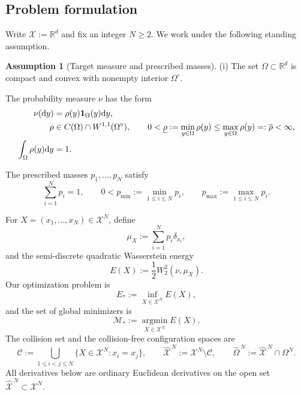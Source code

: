 \documentclass[11pt]{article}
\def\R{\mathbb{R}}
\def\Mc{{\mathcal M}}
\def\Xc{{\mathcal X}}
\def\id{\mathbf{1}}
\def\hOm{\widehat{\Omega}^{\,N}}
\def\hX{\widehat{\Xc}^{\,N}}
\newcommand{\dd}{\mathrm{d}}
\newcommand{\argmin}{\operatorname*{argmin}}
\newcommand{\Coll}{\mathscr C}
\newcommand{\pmin}{p_{\min}}
\newcommand{\pmax}{p_{\max}}
\theoremstyle{definition}
\newtheorem{assumption}{Assumption}
\theoremstyle{remark}
\numberwithin{equation}{section}
\begin{document}
\subsection{Problem formulation}\label{subsec:problem-formulation}

Write $\Xc:=\mathbb R^d$ and fix an integer $N\ge2$.  We work under the following standing assumption.

\begin{assumption}[Target measure and prescribed masses]\label{ass:geometry}
{\rm (i)} The set $\Omega\subset\R^d$ is compact and convex with nonempty interior $\Omega^\circ$.

\medskip

 The probability measure $\nu$ has the form
\begin{align}
 \nu(\dd y)&=\rho(y)\id_{\Omega}(y)\dd y,
 \label{eq:density-assumption-main}\\
 \rho&\in C(\Omega)\cap W^{1,1}(\Omega^\circ),
 \qquad
 0<\underline\rho:=\min_{y\in\Omega}\rho(y)
 \le \max_{y\in\Omega}\rho(y)=:\overline\rho<\infty,
 \notag\\
 \int_\Omega\rho(y)\dd y&=1.
 \notag
\end{align}

 The prescribed masses $p_1,\ldots,p_N$ satisfy
\begin{equation}\label{eq:weights-main}
 \sum_{i=1}^Np_i=1,
 \qquad
 0<\pmin:=\min_{1\le i\le N}p_i,
 \qquad
 \pmax:=\max_{1\le i\le N}p_i.
\end{equation}
\end{assumption}

For $X=(x_1,\ldots,x_N)\in\Xc^N$, define
\begin{equation}\label{eq:muX-intro}
 \mu_X:=\sum_{i=1}^Np_i\delta_{x_i},
\end{equation}
and the semi-discrete quadratic Wasserstein energy
\begin{equation}\label{eq:E-intro}
 E(X):=\frac12W_2^2(\nu,\mu_X).
\end{equation}
Our optimization problem is
\begin{equation}\label{pb:min}
 E_*:=\inf_{X\in\Xc^N}E(X),
\end{equation}
and the set of global minimizers is
\begin{equation}\label{eq:minimizer-set}
 \Mc_*:=\argmin_{X\in\Xc^N}E(X).
\end{equation}
The collision set and the collision-free configuration spaces are
\begin{equation}\label{eq:collision-spaces}
 \Coll:=\bigcup_{1\le i<j\le N}\{X\in\Xc^N:x_i=x_j\},
 \qquad
 \hX:=\Xc^N\setminus\Coll,
 \qquad
 \hOm:=\hX\cap\Omega^N.
\end{equation}
All derivatives below are ordinary Euclidean derivatives on the open set $\hX\subset\Xc^N$.
\end{document}

